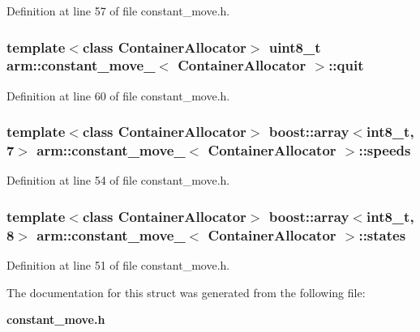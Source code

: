 \-Definition at line 57 of file constant\-\_\-move.\-h.

\subsubsection[{quit}]{\setlength{\rightskip}{0pt plus 5cm}template$<$class \-Container\-Allocator$>$ uint8\-\_\-t {\bf arm\-::constant\-\_\-move\-\_\-}$<$ \-Container\-Allocator $>$\-::{\bf quit}}\label{structarm_1_1constant__move___ada3da8d4a4ab64f2fd1ba10d7279c226}


\-Definition at line 60 of file constant\-\_\-move.\-h.

\subsubsection[{speeds}]{\setlength{\rightskip}{0pt plus 5cm}template$<$class \-Container\-Allocator$>$ boost\-::array$<$int8\-\_\-t, 7$>$ {\bf arm\-::constant\-\_\-move\-\_\-}$<$ \-Container\-Allocator $>$\-::{\bf speeds}}\label{structarm_1_1constant__move___ae91b3375411eda84f485305fe8d76723}


\-Definition at line 54 of file constant\-\_\-move.\-h.

\subsubsection[{states}]{\setlength{\rightskip}{0pt plus 5cm}template$<$class \-Container\-Allocator$>$ boost\-::array$<$int8\-\_\-t, 8$>$ {\bf arm\-::constant\-\_\-move\-\_\-}$<$ \-Container\-Allocator $>$\-::{\bf states}}\label{structarm_1_1constant__move___a2b4bae6eb316d46704e26922291a9646}


\-Definition at line 51 of file constant\-\_\-move.\-h.



\-The documentation for this struct was generated from the following file\-:\begin{DoxyCompactItemize}
\item 
{\bf constant\-\_\-move.\-h}\end{DoxyCompactItemize}
